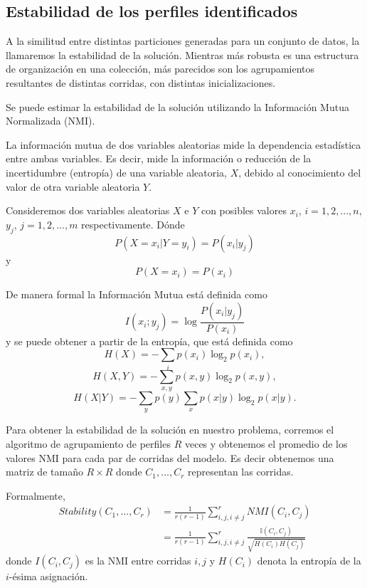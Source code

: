 \subsection{Estabilidad de los perfiles identificados}

A la similitud entre distintas particiones generadas para un conjunto de datos, la llamaremos la estabilidad de la solución. Mientras más robusta es una estructura de organización en una colección, más parecidos son los agrupamientos resultantes de distintas corridas, con distintas inicializaciones.

Se puede estimar la estabilidad de la solución utilizando la Información Mutua Normalizada (NMI).

La información mutua de dos variables aleatorias mide la dependencia estadística entre ambas variables. Es decir, mide la información o reducción de la incertidumbre (entropía) de una variable aleatoria, $X$, debido al conocimiento del valor de otra variable aleatoria $Y$.

Consideremos dos variables aleatorias $X$ e $Y$ con posibles valores $x_i$, $i=1,2,...,n$, $y_j$, $j=1,2,...,m$ respectivamente. Dónde $$
{\displaystyle P(X=x_{i}|Y=y_{i})=P(x_{i}|y_{j})}$$ y $${\displaystyle P(X=x_{i})=P(x_{i})}$$

De manera formal la Información Mutua está definida como
$$ {\displaystyle I(x_{i};y_{j})=\log {\frac {P(x_{i}|y_{j})}{P(x_{i})}}} $$
y se puede obtener a partir de la entropía, que está definida como
$${\displaystyle H(X)=-\sum _{i}p(x_{i})\log _{2}p(x_{i})},$$
$${\displaystyle H(X,Y)=-\sum _{x,y}p(x,y)\log _{2}p(x,y)},$$
$${\displaystyle H(X|Y)=-\sum _{y}p(y)\sum _{x}p(x|y)\log _{2}p(x|y)}.$$

Para obtener la estabilidad de la solución en nuestro problema, corremos el algoritmo de agrupamiento de perfiles $R$ veces y obtenemos el promedio de los valores NMI para cada par de corridas del modelo. Es decir obtenemos una matriz de tamaño $R \times R$ donde $C_1,\ldots,C_r$ representan las corridas.

Formalmente, 
\begin{align}\label{eq:PNMI}
Stability(C_1,\ldots,C_r) &= \frac{1}{r(r-1)}\sum_{i,j,i\not=j}^{r}NMI(C_i,C_j) \\
 &= \frac{1}{r(r-1)}\sum_{i,j,i\not=j}^{r} \frac{\mathbb{I}(C_i,C_j)}{\sqrt{{H}(C_i){H}(C_j)}}
\end{align}
donde ${I}(C_i,C_j)$ es la NMI entre corridas $i,j$ y ${H}(C_i)$ denota la entropía de la $i$-ésima asignación.

